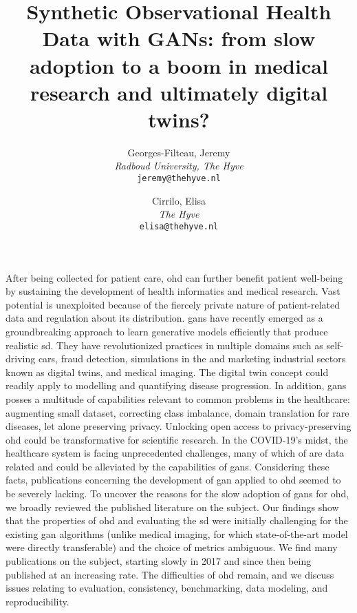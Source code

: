 \documentclass[10pt]{article}
\title{ Synthetic Observational Health Data with GANs: from slow adoption to a boom in medical research and ultimately digital twins?}
\author{
  Georges-Filteau, Jeremy \href{https://orcid.org/0000-0002-0352-6468}{}\\[0.2cm]
  \small \textit{Radboud University, The Hyve}\\
  \small\texttt{jeremy@thehyve.nl}
  \and
  Cirrilo, Elisa \href{https://orcid.org/0000-0002-0241-7833}{}\\[0.2cm]
  \small \textit{The Hyve}\\
  \small\texttt{elisa@thehyve.nl}
}
\renewenvironment{abstract}
 {{\noindent\bfseries{\abstractname}\par\nobreak}\footnotesize}
 {\bigskip}
\begin{document}
    \maketitle
    \vspace{-1em}

    \begingroup
    \let\center\flushleft
    \let\endcenter\endflushleft
    \maketitle
    \endgroup


    \glsresetall
    \begin{abstract}
    After being collected for patient care, \gls{ohd} can further benefit patient well-being by sustaining the development of health informatics and medical research. Vast potential is unexploited because of the fiercely private nature of patient-related data and regulation about its distribution. 
    \glspl{gan} have recently emerged as a groundbreaking approach to learn generative models efficiently that produce realistic \gls{sd}. They have revolutionized practices in multiple domains such as self-driving cars, fraud detection, simulations in the and marketing industrial sectors known as digital twins, and medical imaging. The digital twin concept could readily apply to modelling and quantifying disease progression. In addition, \glspl{gan} posses a multitude of capabilities relevant to common problems in the healthcare: augmenting small dataset, correcting class imbalance, domain translation for rare diseases, let alone preserving privacy. Unlocking open access to privacy-preserving \gls{ohd} could be transformative for scientific research. In the COVID-19's midst, the healthcare system is facing unprecedented challenges, many of which of are data related and could be alleviated by the capabilities of \glspl{gan}.
   Considering these facts, publications concerning the development of  \gls{gan} applied to \gls{ohd} seemed to be severely lacking. To uncover the reasons for the slow adoption of \glspl{gan} for \gls{ohd}, we broadly reviewed the published literature on the subject. Our findings show that the properties of \gls{ohd} and evaluating the \gls{sd} were initially challenging for the existing \gls{gan} algorithms (unlike medical imaging, for which state-of-the-art model were directly transferable) and the choice of metrics ambiguous. We find many publications on the subject, starting slowly in 2017 and since then being published at an increasing rate. The difficulties of \gls{ohd} remain, and we discuss issues relating to evaluation, consistency, benchmarking, data modeling, and reproducibility.
    \end{abstract} 

    
    
    
    
    
    

    \pagebreak

    \printglossary[type=oalgo]
    \printglossary[type=\acronymtype]

    \pagebreak

    
\end{document}
